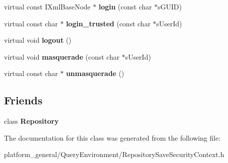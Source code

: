 \begin{DoxyCompactItemize}
\item 
\hypertarget{classgeneral__server_1_1RepositorySaveSecurityContext_aea20652cc5b78f66f2cbcfc54003e035}{virtual const \-I\-Xml\-Base\-Node $\ast$ {\bfseries login} (const char $\ast$s\-G\-U\-I\-D)}\label{classgeneral__server_1_1RepositorySaveSecurityContext_aea20652cc5b78f66f2cbcfc54003e035}

\item 
\hypertarget{classgeneral__server_1_1RepositorySaveSecurityContext_a414df65afd8cb2a3ce51d58501369cb8}{virtual const char $\ast$ {\bfseries login\-\_\-trusted} (const char $\ast$s\-User\-Id)}\label{classgeneral__server_1_1RepositorySaveSecurityContext_a414df65afd8cb2a3ce51d58501369cb8}

\item 
\hypertarget{classgeneral__server_1_1RepositorySaveSecurityContext_a3be930c8cdd198979ecd953339a5900c}{virtual void {\bfseries logout} ()}\label{classgeneral__server_1_1RepositorySaveSecurityContext_a3be930c8cdd198979ecd953339a5900c}

\item 
\hypertarget{classgeneral__server_1_1RepositorySaveSecurityContext_abe145def246d7982edb774eb1603b946}{virtual void {\bfseries masquerade} (const char $\ast$s\-User\-Id)}\label{classgeneral__server_1_1RepositorySaveSecurityContext_abe145def246d7982edb774eb1603b946}

\item 
\hypertarget{classgeneral__server_1_1RepositorySaveSecurityContext_a97fd348f1d6d8c287ab00ee7f14212e9}{virtual const char $\ast$ {\bfseries unmasquerade} ()}\label{classgeneral__server_1_1RepositorySaveSecurityContext_a97fd348f1d6d8c287ab00ee7f14212e9}

\end{DoxyCompactItemize}
\subsection*{\-Friends}
\begin{DoxyCompactItemize}
\item 
\hypertarget{classgeneral__server_1_1RepositorySaveSecurityContext_aaeade420d983c3fba7d0098833055006}{class {\bfseries \-Repository}}\label{classgeneral__server_1_1RepositorySaveSecurityContext_aaeade420d983c3fba7d0098833055006}

\end{DoxyCompactItemize}


\-The documentation for this class was generated from the following file\-:\begin{DoxyCompactItemize}
\item 
platform\-\_\-general/\-Query\-Environment/\-Repository\-Save\-Security\-Context.\-h\end{DoxyCompactItemize}

